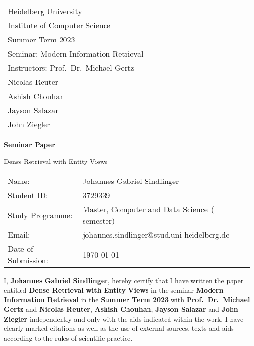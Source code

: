 \documentclass[
     11pt,         %
     a4paper,      %
     oneside,
     ]{article}
\makeatletter
\newcommand{\mytitle}{Dense Retrieval with Entity Views}
\newcommand{\myauthor}{Johannes Gabriel Sindlinger}
\newcommand{\myseminar}{Modern Information Retrieval }
\newcommand{\mysemester}{Summer Term 2023}
\newcommand{\mydozent}{Prof.~Dr.~Michael Gertz}
\newcommand{\mydozentTwo}{Nicolas Reuter}
\newcommand{\mydozentThree}{Ashish Chouhan}
\newcommand{\mydozentFour}{Jayson Salazar}
\newcommand{\mydozentFive}{John Ziegler}
\newcommand{\myMatrikelnummer}{3729339}
\newcommand{\myStudiengang}{Master, Computer and Data Science}
\newcommand{\mySemester}{3}
\newcommand{\myEmail}{johannes.sindlinger@stud.uni-heidelberg.de}
\makeatother
\begin{document}
\begin{titlepage}
\begin{tabular}[l]{l}
Heidelberg University\\
Institute of Computer Science\\
\mysemester\\
Seminar: \myseminar\\
Instructors: \mydozent\\
\phantom{Instructors: }\mydozentTwo\\
\phantom{Instructors: }\mydozentThree\\
  \phantom{Instructors: }\mydozentFour\\
  \phantom{Instructors: }\mydozentFive
\end{tabular}

\vspace{4cm}
\begin{center}
\textbf{\large Seminar Paper} %
\vspace{0.5\baselineskip}

{\huge
\mytitle
}
\end{center}

\vfill 
\begin{tabular}[l]{ll}
Name:           & \myauthor\\
Student ID: & \myMatrikelnummer\\
Study Programme:    & \myStudiengang\ (\nth{\mySemester} semester)\\
Email: & \myEmail\\
Date of Submission: & \today \\
\end{tabular}

\end{titlepage}

\onehalfspacing


\thispagestyle{empty}
\vspace*{100pt}
I, \textbf{\myauthor}, hereby certify that I have written the paper entitled \textbf{\mytitle} in the seminar \textbf{\myseminar} in the \textbf{\mysemester} with \textbf{\mydozent} and \textbf{\mydozentTwo}, \textbf{\mydozentThree}, \textbf{\mydozentFour} and \textbf{\mydozentFive} independently and only with the aids indicated within the work.
I have clearly marked citations as well as the use of external sources, texts and aids according to the rules of scientific practice. \\
\end{document}
